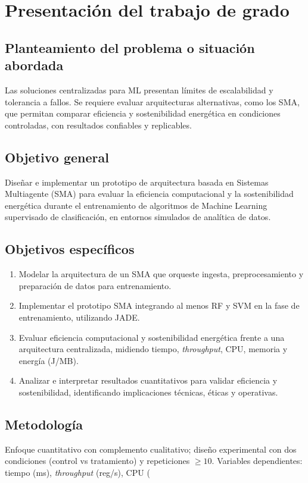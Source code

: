 \documentclass[12pt,oneside]{report}
\begin{document}
\chapter{Presentación del trabajo de grado}
\section{Planteamiento del problema o situación abordada}
Las soluciones centralizadas para ML presentan límites de escalabilidad y tolerancia a fallos. Se requiere evaluar arquitecturas alternativas, como los SMA, que permitan comparar eficiencia y sostenibilidad energética en condiciones controladas, con resultados confiables y replicables.
\section{Objetivo general}
Diseñar e implementar un prototipo de arquitectura basada en Sistemas Multiagente (SMA) para evaluar la eficiencia computacional y la sostenibilidad energética durante el entrenamiento de algoritmos de Machine Learning supervisado de clasificación, en entornos simulados de analítica de datos.
\section{Objetivos específicos}
\begin{enumerate}
  \item Modelar la arquitectura de un SMA que orqueste ingesta, preprocesamiento y preparación de datos para entrenamiento.
  \item Implementar el prototipo SMA integrando al menos RF y SVM en la fase de entrenamiento, utilizando JADE.
  \item Evaluar eficiencia computacional y sostenibilidad energética frente a una arquitectura centralizada, midiendo tiempo, \textit{throughput}, CPU, memoria y energía (J/MB).
  \item Analizar e interpretar resultados cuantitativos para validar eficiencia y sostenibilidad, identificando implicaciones técnicas, éticas y operativas.
\end{enumerate}
\section{Metodología}
Enfoque cuantitativo con complemento cualitativo; diseño experimental con dos condiciones (control vs tratamiento) y repeticiones $\geq 10$. Variables dependientes: tiempo (ms), \textit{throughput} (reg/s), CPU (%
\end{document}
